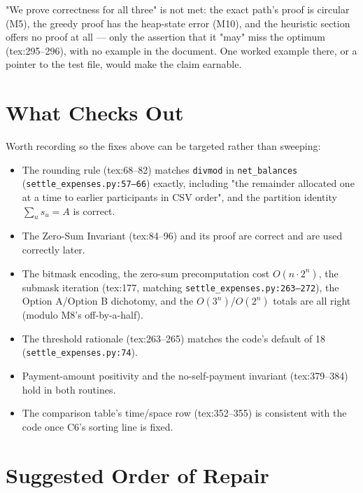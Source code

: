 \documentclass[11pt]{article}
\begin{document}
"We prove correctness for all three" is not met: the exact path's proof is circular (M5), the greedy proof
has the heap-state error (M10), and the heuristic section offers no proof at all --- only the assertion that
it "may" miss the optimum (tex:295--296), with no example in the document. One worked example there, or
a pointer to the test file, would make the claim earnable.

\section{What Checks Out}

Worth recording so the fixes above can be targeted rather than sweeping:

\begin{itemize}
  \item The rounding rule (tex:68--82) matches \texttt{divmod} in \texttt{net\_balances}
(\texttt{settle\_expenses.py:57--66}) exactly, including "the remainder allocated one at a time to earlier participants in CSV
order", and the partition identity $\sum_u s_u = A$ is correct.
  \item The Zero-Sum Invariant (tex:84--96) and its proof are correct and are used correctly later.
  \item The bitmask encoding, the zero-sum precomputation cost $O(n \cdot 2^n)$, the submask iteration
(tex:177, matching \texttt{settle\_expenses.py:263--272}), the Option A/Option B dichotomy, and the
$O(3^n)$/$O(2^n)$ totals are all right (modulo M8's off-by-a-half).
  \item The threshold rationale (tex:263--265) matches the code's default of 18 (\texttt{settle\_expenses.py:74}).
  \item Payment-amount positivity and the no-self-payment invariant (tex:379--384) hold in both routines.
  \item The comparison table's time/space row (tex:352--355) is consistent with the code once C6's sorting
line is fixed.
\end{itemize}

\section{Suggested Order of Repair}
\end{document}
